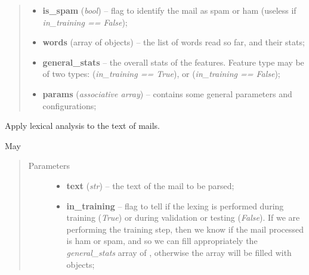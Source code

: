 \documentclass[letterpaper,10pt,english]{sphinxmanual}
\begin{document}
\begin{fulllineitems}
\begin{fulllineitems}
\begin{quote}
\begin{description}
\begin{itemize}
\item {} 
\textbf{is\_spam} (\emph{bool}) -- flag to identify the mail as spam or ham (useless if             \emph{in\_training == False});

\item {} 
\textbf{words} (array of {\hyperref[index:gen_stat.Word]{}} objects) -- the list of words read so far, and their stats;

\item {} 
\textbf{general\_stats} -- the overall stats of the features. Feature type may be            of two types:                {\hyperref[index:gen_stat.Stat]{}} (\emph{in\_training == True}), or                {\hyperref[index:test_stat.Test_stat]{}} (\emph{in\_training == False});

\item {} 
\textbf{params} (\emph{associative array}) -- contains some general parameters and configurations;

\end{itemize}

\end{description}\end{quote}

\end{fulllineitems}


\begin{fulllineitems}
\label{index:lexer.Lexer.lexer_words}
Apply lexical analysis to the text of mails.

May
\begin{quote}\begin{description}
\item[{Parameters}] \leavevmode\begin{itemize}
\item {} 
\textbf{text} (\emph{str}) -- the text of the mail to be parsed;

\item {} 
\textbf{in\_training} -- flag to tell if the lexing is performed during training            (\emph{True}) or during validation or testing (\emph{False}). If we are performing            the training step, then we know if the mail processed is ham or spam, and
so we can fill appropriately the \emph{general\_stats} array of
{\hyperref[index:gen_stat.Stat]{}}, otherwise the array will be filled with
{\hyperref[index:test_stat.Test_stat]{}} objects;


\end{itemize}
\end{description}
\end{quote}
\end{fulllineitems}
\end{fulllineitems}
\end{document}
